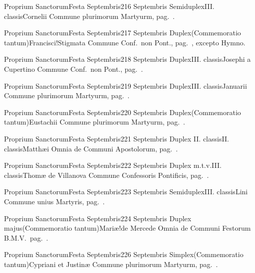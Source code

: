 \documentclass[nocturnale-romanum.tex]{subfiles}
\begin{document}
	{Proprium Sanctorum}{Festa Septembris}{2}{16 Septembris}
	{Semiduplex}{III. classis}{Cornelii}
	{Commune plurimorum Martyurm, pag.\ \pageref{M-PMEX}.}
	{}

	{Proprium Sanctorum}{Festa Septembris}{2}{17 Septembris}
	{Duplex}{(Commemoratio tantum)}{Francisci!Stigmata}
	{Commune Conf.\ non Pont., pag.\ \pageref{M-CONP}, excepto Hymno.}
	{}

	{Proprium Sanctorum}{Festa Septembris}{2}{18 Septembris}
	{Duplex}{III. classis}{Josephi a Cupertino}
	{Commune Conf.\ non Pont., pag.\ \pageref{M-CONP}.}
	{}

	{Proprium Sanctorum}{Festa Septembris}{2}{19 Septembris}
	{Duplex}{III. classis}{Januarii}
	{Commune plurimorum Martyurm, pag.\ \pageref{M-PMEX}.}
	{}

	{Proprium Sanctorum}{Festa Septembris}{2}{20 Septembris}
	{Duplex}{(Commemoratio tantum)}{Eustachii}
	{Commune plurimorum Martyurm, pag.\ \pageref{M-PMEX}.}
	{}

	{Proprium Sanctorum}{Festa Septembris}{2}{21 Septembris}
	{Duplex II. classis}{II. classis}{Matthæi}
	{Omnia de Communi Apostolorum, pag.\ \pageref{M-APEX}.}
	{}

	{Proprium Sanctorum}{Festa Septembris}{2}{22 Septembris}
	{Duplex m.t.v.}{III. classis}{Thomæ de Villanova}
	{Commune Confessoris Pontificis, pag.\ \pageref{M-COPO}.}
	{}

	{Proprium Sanctorum}{Festa Septembris}{2}{23 Septembris}
	{Semiduplex}{III. classis}{Lini}
	{Commune unius Martyris, pag.\ \pageref{M-UMEX}.}
	{}

	{Proprium Sanctorum}{Festa Septembris}{2}{24 Septembris}
	{Duplex majus}{(Commemoratio tantum)}{Mariæ!de Mercede}
	{Omnia de Communi Festorum B.M.V.\ pag.\ \pageref{M-CBMV}.}
	{}

	{Proprium Sanctorum}{Festa Septembris}{2}{26 Septembris}
	{Simplex}{(Commemoratio tantum)}{Cypriani et Justinæ}
	Commune plurimorum Martyurm, pag.\ \pageref{M-PMEX}.{}
	{}
\end{document}
